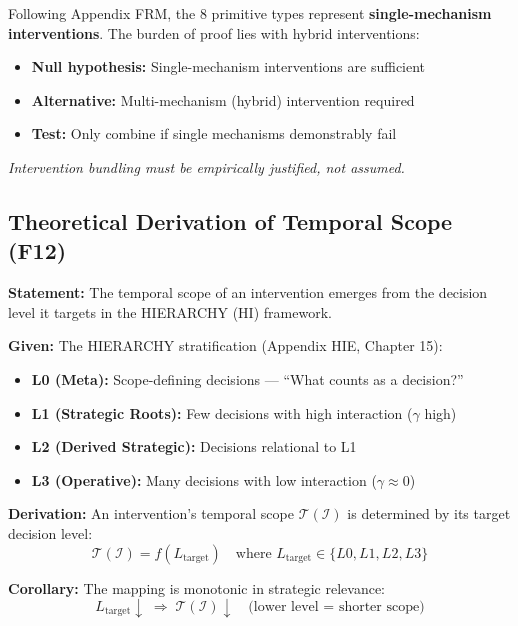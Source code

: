 \begin{tcolorbox}[colback=red!5!white, colframe=red!75!black,
    title=\textbf{Methodological Note: XVIII Exclusion Principle for Types}]
Following Appendix FRM, the 8 primitive types represent \textbf{single-mechanism interventions}. The burden of proof lies with hybrid interventions:

\begin{itemize}[nosep]
    \item \textbf{Null hypothesis:} Single-mechanism interventions are sufficient
    \item \textbf{Alternative:} Multi-mechanism (hybrid) intervention required
    \item \textbf{Test:} Only combine if single mechanisms demonstrably fail
\end{itemize}

\textit{Intervention bundling must be empirically justified, not assumed.}
\end{tcolorbox}


\subsection{Theoretical Derivation of Temporal Scope (F12)}
\label{sec:hhh-temporal}

\begin{tcolorbox}[colback=blue!5!white, colframe=blue!75!black,
    title=\textbf{Theorem HHH-T2: Temporal Scope Emergence from HIERARCHY}]

\textbf{Statement:} The temporal scope of an intervention emerges from the decision level it targets in the HIERARCHY (HI) framework.

\textbf{Given:} The HIERARCHY stratification (Appendix HIE, Chapter 15):
\begin{itemize}[nosep]
    \item \textbf{L0 (Meta):} Scope-defining decisions --- ``What counts as a decision?''
    \item \textbf{L1 (Strategic Roots):} Few decisions with high interaction ($\gamma$ high)
    \item \textbf{L2 (Derived Strategic):} Decisions relational to L1
    \item \textbf{L3 (Operative):} Many decisions with low interaction ($\gamma \approx 0$)
\end{itemize}

\textbf{Derivation:} An intervention's temporal scope $\mathcal{T}(\mathcal{I})$ is determined by its target decision level:
\begin{equation}
\mathcal{T}(\mathcal{I}) = f(L_{\text{target}}) \quad \text{where } L_{\text{target}} \in \{L0, L1, L2, L3\}
\label{eq:hhh-temporal-mapping}
\end{equation}

\textbf{Corollary:} The mapping is monotonic in strategic relevance:
\begin{equation}
L_{\text{target}} \downarrow \; \Rightarrow \; \mathcal{T}(\mathcal{I}) \downarrow \quad \text{(lower level = shorter scope)}
\end{equation}

\end{tcolorbox}

